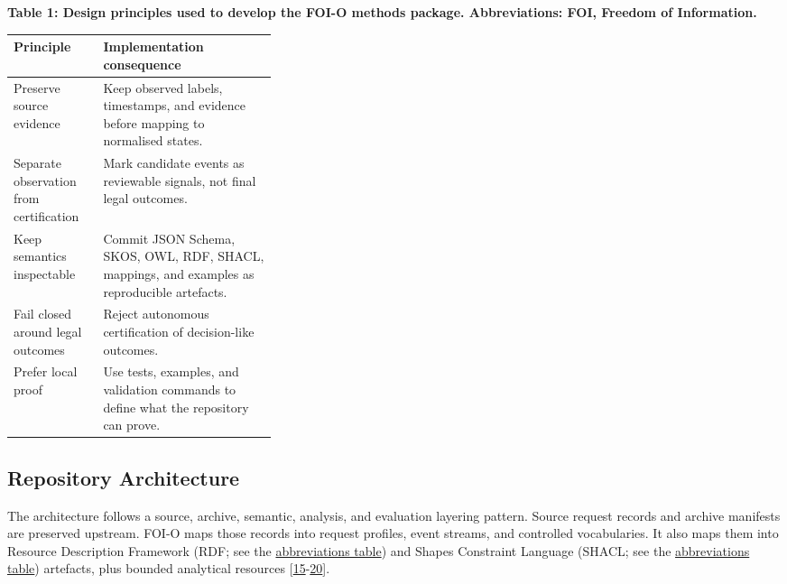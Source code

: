 \documentclass[
]{article}
\begin{document}
\begin{table}[H]
\small
\hypertarget{tab-design-principles}{}
\begin{center}\small\textbf{Table 1: Design principles used to develop the FOI-O methods package. Abbreviations: FOI, Freedom of Information.}\end{center}
\begin{tabularx}{\linewidth}{>{\raggedright\arraybackslash}p{0.34\linewidth}X}
\toprule
Principle & Implementation consequence \\
\midrule
Preserve source evidence & Keep observed labels, timestamps, and evidence before mapping to normalised states. \\
Separate observation from certification & Mark candidate events as reviewable signals, not final legal outcomes. \\
Keep semantics inspectable & Commit JSON Schema, SKOS, OWL, RDF, SHACL, mappings, and examples as reproducible artefacts. \\
Fail closed around legal outcomes & Reject autonomous certification of decision-like outcomes. \\
Prefer local proof & Use tests, examples, and validation commands to define what the repository can prove. \\
\bottomrule
\end{tabularx}
\end{table}

\subsection{Repository Architecture}\label{repository-architecture}

The architecture follows a source, archive, semantic, analysis, and
evaluation layering pattern. Source request records and archive
manifests are preserved upstream. FOI-O maps those records into request
profiles, event streams, and controlled vocabularies. It also maps them
into Resource Description Framework (RDF; see the
\hyperlink{tab-abbreviations}{abbreviations table}) and Shapes
Constraint Language (SHACL; see the
\hyperlink{tab-abbreviations}{abbreviations table}) artefacts, plus
bounded analytical resources {[}\hyperlink{ref-15}{15}-\hyperlink{ref-20}{20}{]}.
\end{document}
